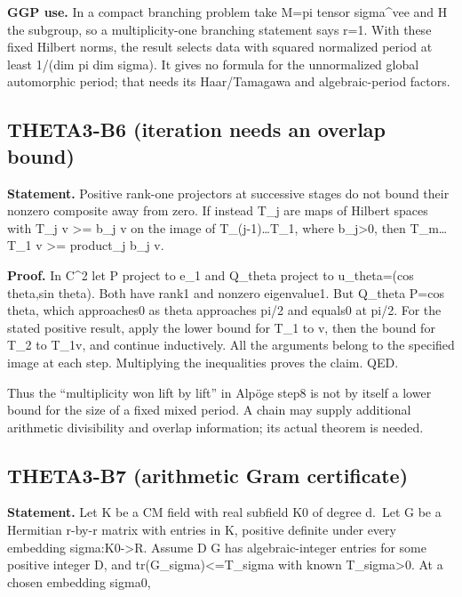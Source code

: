 \textbf{GGP use.} In a compact branching problem take M=pi tensor sigma\^{}vee and H the subgroup, so a multiplicity-one branching statement says r=1. With these fixed Hilbert norms, the result selects data with squared normalized period at least 1/(dim pi dim sigma). It gives no formula for the unnormalized global automorphic period; that needs its Haar/Tamagawa and algebraic-period factors.

\subsection{THETA3-B6 (iteration needs an overlap bound)}\label{theta3-b6-iteration-needs-an-overlap-bound}\label{B6}

\textbf{Statement.} Positive rank-one projectors at successive stages do not bound their nonzero composite away from zero. If instead T\_j are maps of Hilbert spaces with \textbar\textbar T\_j v\textbar\textbar{} \textgreater= b\_j \textbar\textbar v\textbar\textbar{} on the image of T\_(j-1)\ldots T\_1, where b\_j\textgreater0, then \textbar\textbar T\_m\ldots T\_1 v\textbar\textbar{} \textgreater= product\_j b\_j \textbar\textbar v\textbar\textbar.

\textbf{Proof.} In C\^{}2 let P project to e\_1 and Q\_theta project to u\_theta=(cos theta,sin theta). Both have rank1 and nonzero eigenvalue1. But \textbar\textbar Q\_theta P\textbar\textbar=\textbar cos theta\textbar, which approaches0 as theta approaches pi/2 and equals0 at pi/2. For the stated positive result, apply the lower bound for T\_1 to v, then the bound for T\_2 to T\_1v, and continue inductively. All the arguments belong to the specified image at each step. Multiplying the inequalities proves the claim. QED.

Thus the ``multiplicity won lift by lift'' in Alpöge step8 is not by itself a lower bound for the size of a fixed mixed period. A chain may supply additional arithmetic divisibility and overlap information; its actual theorem is needed.

\subsection{THETA3-B7 (arithmetic Gram certificate)}\label{theta3-b7-arithmetic-gram-certificate}\label{B7}

\textbf{Statement.} Let K be a CM field with real subfield K0 of degree d.~Let G be a Hermitian r-by-r matrix with entries in K, positive definite under every embedding sigma:K0-\textgreater R. Assume D G has algebraic-integer entries for some positive integer D, and tr(G\_sigma)\textless=T\_sigma with known T\_sigma\textgreater0. At a chosen embedding sigma0,

